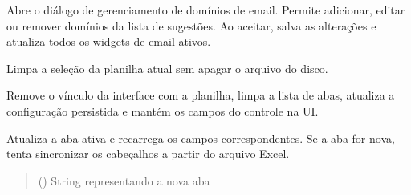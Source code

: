 \documentclass[letterpaper,10pt,english]{sphinxmanual}
\begin{document}
\begin{fulllineitems}
\begin{fulllineitems}
\label{\detokenize{api/app:app.App.open_email_domains}}
\pysigstartsignatures
\pysiglinewithargsret
{}
{}
{}
\pysigstopsignatures
\sphinxAtStartPar
Abre o diálogo de gerenciamento de domínios de e\sphinxhyphen{}mail.
Permite adicionar, editar ou remover domínios da lista de sugestões.
Ao aceitar, salva as alterações e atualiza todos os widgets de e\sphinxhyphen{}mail ativos.
\begin{quote}\begin{description}
\sphinxAtStartPar
{}

\end{description}\end{quote}

\end{fulllineitems}


\begin{fulllineitems}
\label{\detokenize{api/app:app.App.clear_selected_sheet}}
\pysigstartsignatures
\pysiglinewithargsret
{}
{}
{}
\pysigstopsignatures
\sphinxAtStartPar
Limpa a seleção da planilha atual sem apagar o arquivo do disco.

\sphinxAtStartPar
Remove o vínculo da interface com a planilha, limpa a lista de abas,
atualiza a configuração persistida e mantém os campos do controle na UI.
\begin{quote}\begin{description}
\sphinxAtStartPar
{}

\end{description}\end{quote}

\end{fulllineitems}


\begin{fulllineitems}
\label{\detokenize{api/app:app.App.on_sheet_changed}}
\pysigstartsignatures
\pysiglinewithargsret
{}
{}
{}
\pysigstopsignatures
\sphinxAtStartPar
Atualiza a aba ativa e recarrega os campos correspondentes. Se a aba for nova,
tenta sincronizar os cabeçalhos a partir do arquivo Excel.
\begin{quote}\begin{description}
\sphinxAtStartPar
{} () \textendash{} String representando a nova aba


\end{description}
\end{quote}
\end{fulllineitems}
\end{fulllineitems}
\end{document}
